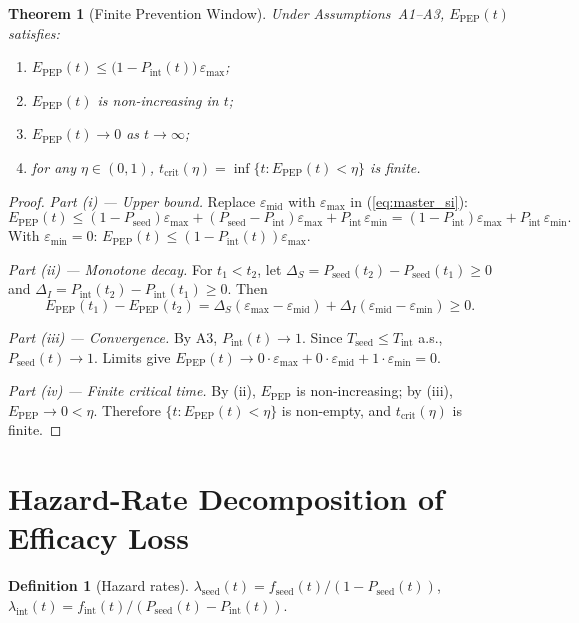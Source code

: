 \documentclass[11pt]{article}
\newtheorem{theorem}{Theorem}[section]
\theoremstyle{definition}
\newtheorem{definition}{Definition}[section]
\theoremstyle{remark}
\newcommand{\Tseed}{T_{\text{seed}}}
\newcommand{\Tint}{T_{\text{int}}}
\newcommand{\Pseed}{P_{\text{seed}}}
\newcommand{\Pint}{P_{\text{int}}}
\newcommand{\Epep}{E_{\text{PEP}}}
\newcommand{\tcrit}{t_{\text{crit}}}
\newcommand{\emax}{\varepsilon_{\max}}
\newcommand{\emid}{\varepsilon_{\text{mid}}}
\newcommand{\emin}{\varepsilon_{\min}}
\begin{document}
\begin{theorem}[Finite Prevention Window]\label{thm:finite}
Under Assumptions~A1--A3, $\Epep(t)$ satisfies:
\begin{enumerate}[label=\textnormal{(\roman*)},leftmargin=2.5em]
    \item $\Epep(t) \leq \big(1 - \Pint(t)\big)\,\emax$;
    \item $\Epep(t)$ is non-increasing in $t$;
    \item $\Epep(t) \to 0$ as $t \to \infty$;
    \item for any $\eta \in (0,1)$, $\tcrit(\eta) = \inf\{t : \Epep(t) < \eta\}$ is finite.
\end{enumerate}
\end{theorem}

\begin{proof}
\textit{Part (i) --- Upper bound.} Replace $\emid$ with $\emax$ in (\ref{eq:master_si}):
\[
\Epep(t) \leq (1 - \Pseed)\emax + (\Pseed - \Pint)\emax + \Pint\,\emin = (1 - \Pint)\emax + \Pint\,\emin.
\]
With $\emin = 0$: $\Epep(t) \leq (1 - \Pint(t))\emax$.

\textit{Part (ii) --- Monotone decay.} For $t_{1} < t_{2}$, let $\Delta_{S} = \Pseed(t_{2}) - \Pseed(t_{1}) \geq 0$ and $\Delta_{I} = \Pint(t_{2}) - \Pint(t_{1}) \geq 0$. Then
\[
\Epep(t_{1}) - \Epep(t_{2}) = \Delta_{S}(\emax - \emid) + \Delta_{I}(\emid - \emin) \geq 0.
\]

\textit{Part (iii) --- Convergence.} By A3, $\Pint(t) \to 1$. Since $\Tseed \leq \Tint$ a.s., $\Pseed(t) \to 1$. Limits give $\Epep(t) \to 0\cdot\emax + 0\cdot\emid + 1\cdot\emin = 0$.

\textit{Part (iv) --- Finite critical time.} By (ii), $\Epep$ is non-increasing; by (iii), $\Epep \to 0 < \eta$. Therefore $\{t : \Epep(t) < \eta\}$ is non-empty, and $\tcrit(\eta)$ is finite.
\end{proof}

\section{Hazard-Rate Decomposition of Efficacy Loss}

\begin{definition}[Hazard rates]
$\lambda_{\text{seed}}(t) = f_{\text{seed}}(t)/(1 - \Pseed(t))$, $\lambda_{\text{int}}(t) = f_{\text{int}}(t)/(\Pseed(t) - \Pint(t))$.
\end{definition}
\end{document}
